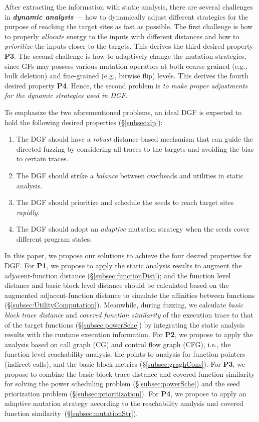 After extracting the information with static analysis, there are several  challenges in \textbf{\emph{dynamic analysis}} --- how to dynamically adjust different strategies for the purpose of reaching the target sites as fast as possible.
The first challenge is how to properly \emph{allocate} energy to the inputs with different distances and how to \emph{prioritize} the inputs closer to the targets.
This derives the third desired property \textbf{P3}.
The second challenge is how to adaptively change the mutation strategies, since GFs may possess various mutation operators at both coarse-grained (e.g., bulk deletion) and fine-grained (e.g., bitwise flip) levels.
 This derives the fourth desired property \textbf{P4}.
Hence, the second problem is \emph{to make proper adjustments for the dynamic strategies used in DGF}.


To emphasize the two aforementioned problems, an ideal DGF is expected to hold the following desired properties (\S\ref{subsec:dp}):
\begin{enumerate}[\textbf{P}1]
\itemsep0em 
\item The DGF should have a \emph{robust} distance-based mechanism that can guide the directed fuzzing by considering all traces to the targets and avoiding the bias to certain traces.
\item The DGF should strike a \emph{balance} between overheads and utilities in static analysis.
\item The DGF should prioritize and schedule the seeds to reach target sites \emph{rapidly}.\item The DGF should adopt an \emph{adaptive} mutation strategy when the seeds cover different program states. \end{enumerate}


In this paper, we propose our solutions to achieve the four desired properties for DGF. 
For \textbf{P1}, we propose to apply the static analysis results to augment the adjacent-function distance (\S\ref{subsec:functionDist}); and the function level distance and basic block level distance should be calculated based on the augmented adjacent-function distance to simulate the affinities between functions (\S\ref{subsec:UtilityComputation}).
Meanwhile, during fuzzing, we calculate \emph{basic block trace distance} and \emph{covered function similarity} of the execution trace to that of the target functions (\S\ref{subsec:powerSche}) by integrating the static analysis results with the runtime execution information.
For \textbf{P2}, we propose to apply the analysis based on call graph (CG) and control flow graph (CFG), i.e., the function level reachability analysis, the points-to analysis for function pointers (indirect calls), and the basic block metrics (\S\ref{subsec:graghCons}). 
For \textbf{P3}, we propose to combine the basic block trace distance and covered function similarity for solving the power scheduling problem (\S\ref{subsec:powerSche}) and the seed priorization problem (\S\ref{subsec:prioritization}). 
For \textbf{P4}, we propose to apply an adaptive mutation strategy according to the reachability analysis and covered function similarity~(\S\ref{subsec:mutationStr}).

